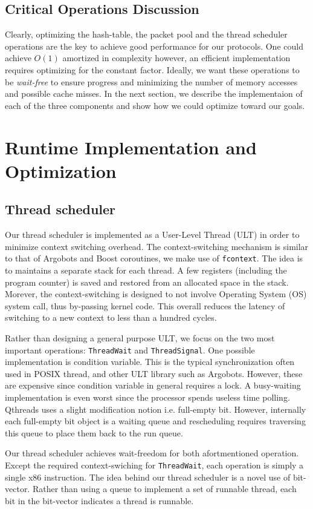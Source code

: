 \documentclass{sig-alternate-05-2015}
\begin{document}
\subsection{Critical Operations Discussion}
Clearly, optimizing the hash-table, the packet pool and the thread scheduler
operations are the key to achieve good performance for our protocols. One could
achieve $O(1)$ amortized in complexity however, an efficient implementation
requires optimizing for the constant factor. Ideally, we want these operations
to be \textit{wait-free} to ensure progress and minimizing the number of memory
accesses and possible cache misses. In the next section, we describe the
implementaion of each of the three components and show how we could optimize
toward our goals.

\section{Runtime Implementation and Optimization}
\subsection{Thread scheduler}
Our thread scheduler is implemented as a User-Level Thread (ULT) in order to
minimize context switching overhead. The context-switching mechanism is similar
to that of Argobots and Boost coroutines, we make use of \texttt{fcontext}. The
idea is to maintains a separate stack for each thread. A few registers
(including the program counter) is saved and restored from an allocated space
in the stack. Morever, the context-switching is designed to not involve
Operating System (OS) system call, thus by-passing kernel code. This overall
reduces the latency of switching to a new context to less than a hundred cycles.

Rather than designing a general purpose ULT, we focus on the two most important
operations: \texttt{ThreadWait} and \texttt{ThreadSignal}. One possible
implementation is condition variable. This is the typical synchronization often
used in POSIX thread, and other ULT library such as Argobots.  However, these
are expensive since condition variable in general requires a lock. A
busy-waiting implementation is even worst since the processor spends useless
time polling. Qthreads uses a slight modification notion i.e.  full-empty bit.
However, internally each full-empty bit object is a waiting queue and
rescheduling requires traversing this queue to place them back to the run
queue.

Our thread scheduler achieves wait-freedom for both afortmentioned operation.
Except the required context-swiching for \texttt{ThreadWait}, each operation is
simply a single x86 instruction. The idea behind our thread scheduler is a novel
use of bit-vector. Rather than using a queue to implement a set of runnable thread,
each bit in the bit-vector indicates a thread is runnable.
\end{document}
